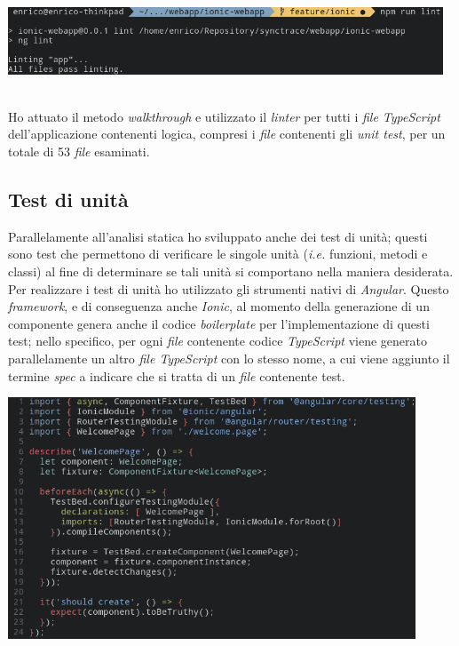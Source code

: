 \begin{minipage}{\linewidth}
  \centering
    \includegraphics[height=2cm]{immagini/nglint}
\end{minipage} \\

Ho attuato il metodo \textit{walkthrough} e utilizzato il \textit{linter} per tutti i \textit{file TypeScript} dell'applicazione contenenti logica, compresi i \textit{file} contenenti gli \textit{unit test}, per un totale di 53 \textit{file} esaminati.

\subsection{Test di unità}

Parallelamente all'analisi statica ho sviluppato anche dei test di unità; questi sono test che permettono di verificare le singole unità (\textit{i.e.} funzioni, metodi e classi) al fine di determinare se tali unità si comportano nella maniera desiderata. \\
Per realizzare i test di unità ho utilizzato gli strumenti nativi di \textit{Angular}. Questo \textit{framework}, e di conseguenza anche \textit{Ionic}, al momento della generazione di un componente genera anche il codice \textit{boilerplate} per l'implementazione di questi test; nello specifico, per ogni \textit{file} contenente codice \textit{TypeScript} viene generato parallelamente un altro \textit{file TypeScript} con lo stesso nome, a cui viene aggiunto il termine \textit{spec} a indicare che si tratta di un \textit{file} contenente test. \\

\begin{minipage}{\linewidth}
  \centering
    \includegraphics[height=7.2cm]{immagini/jasminetest}
\end{minipage} \\

